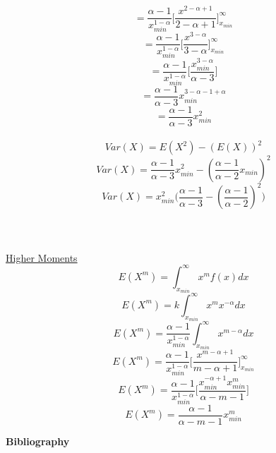 \documentclass[14pt, a4paper]{article}
\theoremstyle{definition}
\begin{document}
\[  =  \frac{\alpha - 1 }{x_{min}^{1-\alpha}} \Big[ \frac{x^{2 -\alpha+1}}{2- \alpha +1} \Big]^\infty_{x_{min}} \]
\[  =  \frac{\alpha - 1 }{x_{min}^{1-\alpha}} \Big[ \frac{x^{3 -\alpha}}{3 - \alpha } \Big]^\infty_{x_{min}} \]
\[  =  \frac{\alpha - 1 }{x_{min}^{1-\alpha}} \Big[ \frac{x_{min}^{3 -\alpha}}{\alpha - 3 } \Big] \]
\[  =  \frac{\alpha - 1 }{\alpha - 3} x_{min}^{3 -\alpha - 1+ \alpha}\]
\[ = \frac{\alpha - 1 }{\alpha - 3} x_{min}^2\]
\\
\[ Var(X) = E(X^2) - (E(X))^2\]
\[ Var(X) = \frac{\alpha - 1 }{\alpha - 3} x_{min}^2 - (\frac{\alpha - 1}{\alpha - 2} x_{min})^2\]
\[ Var(X) = x_{min}^2 \Big( \frac{\alpha -1}{\alpha - 3} - (\frac{\alpha - 1}{\alpha - 2}) ^2\Big)\]
\\ 
\\ 
\\ \underline{Higher Moments}
\[ E(X^m) = \int^\infty_{x_{min}} x^m f(x) dx \] 
\[ E(X^m) = k \int^\infty_{x_{min}} x^m x^{-\alpha} dx\]
\[ E(X^m) = \frac{\alpha - 1}{x_{min}^{1 -\alpha}} \int^\infty_{x_{min}} x^{m-\alpha} dx\]
\[ E(X^m) = \frac{\alpha - 1}{x_{min}^{1 -\alpha}} \Big[ \frac{x^{m-\alpha + 1}}{m- \alpha +1} \Big]^\infty _{x_{min}} \]
\[ E(X^m) = \frac{\alpha - 1}{x_{min}^{1 -\alpha}} \Big[ \frac{x_{min}^{-\alpha + 1} x_{min}^m}{\alpha -m  -1} \Big] \]
\[ E(X^m) = \frac{\alpha - 1}{\alpha - m - 1} x_{min}^m\]
\newpage
\begin{center}
    \Large{\textbf{Bibliography}}
\end{center}
\end{document}
